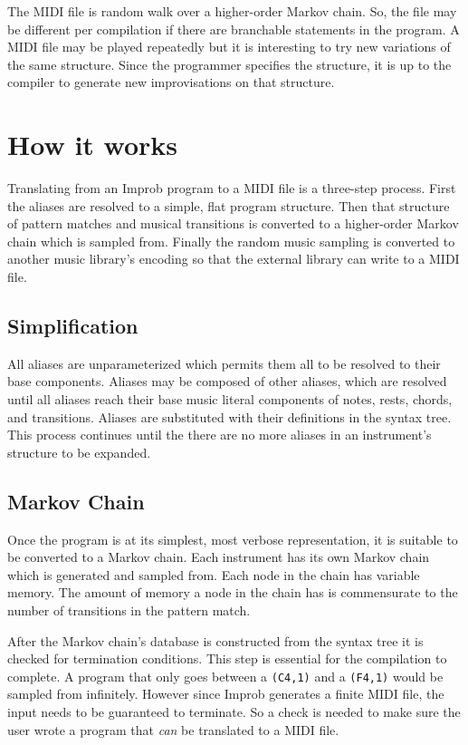 \documentclass{sigplanconf-pldi15}
\begin{document}
The MIDI file is random walk over a higher-order Markov chain. So, the file may be different per compilation if there are branchable statements in the program. A MIDI file may be played repeatedly but it is interesting to try new variations of the same structure. Since the programmer specifies the structure, it is up to the compiler to generate new improvisations on that structure.

\section{How it works}
Translating from an Improb program to a MIDI file is a three-step process. First the aliases are resolved to a simple, flat program structure. Then that structure of pattern matches and musical transitions is converted to a higher-order Markov chain which is sampled from. Finally the random music sampling is converted to another music library's encoding so that the external library can write to a MIDI file.

\subsection{Simplification}
All aliases are unparameterized which permits them all to be resolved to their base components. Aliases may be composed of other aliases, which are resolved until all aliases reach their base music literal components of notes, rests, chords, and transitions. Aliases are substituted with their definitions in the syntax tree. This process continues until the there are no more aliases in an instrument's structure to be expanded.

\subsection{Markov Chain}
Once the program is at its simplest, most verbose representation, it is suitable to be converted to a Markov chain. Each instrument has its own Markov chain which is generated and sampled from. Each node in the chain has variable memory. The amount of memory a node in the chain has is commensurate to the number of transitions in the pattern match.

After the Markov chain's database is constructed from the syntax tree it is checked for termination conditions. This step is essential for the compilation to complete. A program that only goes between a \texttt{(C4,1)} and a \texttt{(F4,1)} would be sampled from infinitely. However since Improb generates a finite MIDI file, the input needs to be guaranteed to terminate. So a check is needed to make sure the user wrote a program that \textit{can} be translated to a MIDI file.
\end{document}
